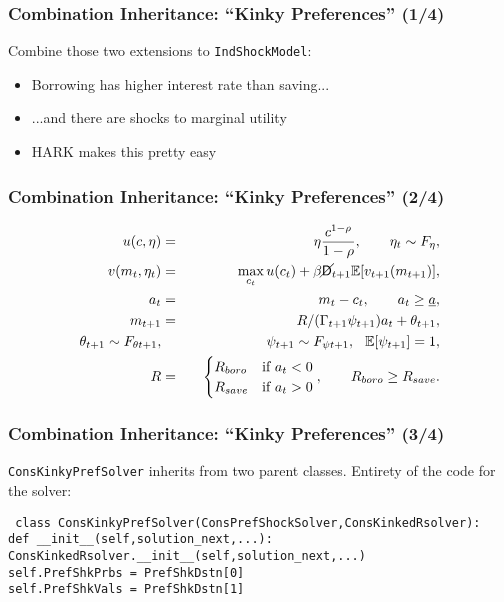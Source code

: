 \documentclass[11ptt]{beamer}
\newcommand{\E}{\mathbb{E}}
\newcommand{\Die}{\mathsf{D}}
\newcommand{\Live}{\cancel{\Die}}
\begin{document}
\begin{frame}
\frametitle{Combination Inheritance: ``Kinky Preferences'' (1/4)}
Combine those two extensions to \texttt{IndShockModel}:
\begin{itemize}
\item Borrowing has higher interest rate than saving...

\item ...and there are shocks to marginal utility

\item HARK makes this pretty easy
\end{itemize}
\end{frame}

\begin{frame}
\frametitle{Combination Inheritance: ``Kinky Preferences'' (2/4)}
\begin{eqnarray*}
u(c,\eta) &=& \eta \frac{c^{1-\rho}}{1-\rho}, \qquad \eta_t \sim F_{\eta},\\
v(m_t,\eta_t) &=& \max_{c_t} u(c_t) + \beta \Live_{t+1} \E [v_{t+1}(m_{t+1}) ], \\
a_t &=& m_t - c_t, \qquad a_t \geq \underline{a}, \\
m_{t+1} &=& R/(\Gamma_{t+1} \psi_{t+1}) a_t + \theta_{t+1}, \\
\theta_{t+1} \sim F_{\theta t+1}, &\qquad& \psi_{t+1} \sim F_{\psi t+1}, \hspace{0.25cm} \E[\psi_{t+1}] = 1, \\
R &=& \begin{cases}
R_{boro} & \text{if  } a_t < 0 \\
R_{save} & \text{if  } a_t > 0
\end{cases}, \qquad R_{boro} \geq R_{save}.
\end{eqnarray*}
\end{frame}

\begin{frame}
\frametitle{Combination Inheritance: ``Kinky Preferences'' (3/4)}
\texttt{ConsKinkyPrefSolver} inherits from two parent classes.  Entirety of the code for the solver:

\scriptsize{
\texttt{
class ConsKinkyPrefSolver(ConsPrefShockSolver,ConsKinkedRsolver):\\
\qquad def \_\_init\_\_(self,solution\_next,...):\\
\qquad \qquad ConsKinkedRsolver.\_\_init\_\_(self,solution\_next,...)\\
\qquad \qquad self.PrefShkPrbs = PrefShkDstn[0]\\
\qquad \qquad self.PrefShkVals = PrefShkDstn[1]\\
}}
\end{frame}
\end{document}
